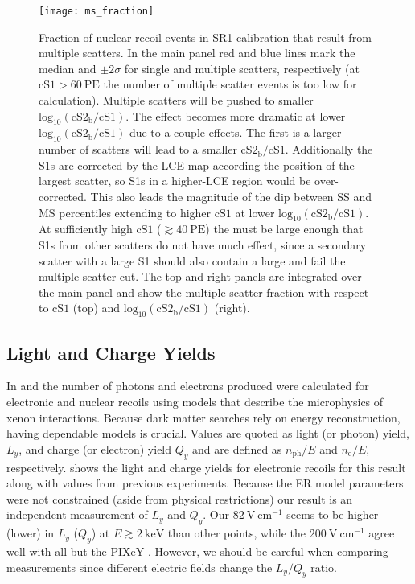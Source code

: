 \begin{figure}
\centering
\texttt{[image: ms\_fraction]}
\caption{Fraction of nuclear recoil events in SR1 \ambe calibration that result from multiple scatters.  In the main panel red and
blue lines mark the median and $\pm 2\sigma$ for single and multiple scatters, respectively (at $\mathrm{cS1} > 60\ \mathrm{PE}$ the
number of multiple scatter events is too low for calculation).  Multiple scatters will be pushed to smaller
$\mathrm{log}_{10}(\mathrm{cS2_b / cS1})$.  The effect becomes more dramatic at lower
$\mathrm{log}_{10}(\mathrm{cS2_b / cS1})$ due to a couple effects.  The first is a larger number of scatters will lead to a
smaller $\mathrm{cS2_b / cS1}$.  Additionally the S1s are corrected by the LCE map
according the position of the largest scatter, so S1s in a higher-LCE region
would be over-corrected.  This also leads the magnitude of the dip between SS and MS percentiles extending to higher $\mathrm{cS1}$
at lower $\mathrm{log}_{10}(\mathrm{cS2_b / cS1})$.  At sufficiently high $\mathrm{cS1}$ ($\gtrsim 40\ \mathrm{PE}$) the
\cstwob must be large enough that S1s from other scatters do not have much effect, since a secondary scatter with a large S1 should also
contain a large \stwob and fail the multiple scatter cut.  The top and right panels are integrated over the main panel and show the
multiple scatter fraction with respect to $\mathrm{cS1}$ (top) and $\mathrm{log}_{10}(\mathrm{cS2_b / cS1})$ (right).}
\label{fig:er_nr_calibrations_results_ms_fraction}
\end{figure}



\subsection{Light and Charge Yields}
\label{subsec:er_nr_calibrations_results_ly_qy}
In  and  the number
of photons and electrons produced were calculated for electronic and nuclear recoils using models that describe
the microphysics of xenon interactions.  Because dark matter searches rely on energy reconstruction, having dependable models is
crucial.  Values are quoted as light (or photon) yield, $L_y$, and charge (or electron) yield $Q_y$ and are defined as
$n_{\mathrm{ph}}/E$ and $n_{\mathrm{e}} / E$, respectively.   shows the light and
charge yields for electronic recoils for this result along with values from previous experiments.  Because the ER model parameters were
not constrained (aside from physical restrictions) our result is an independent measurement of $L_y$ and $Q_y$.  Our
$82\ \mathrm{V\ cm^{-1}}$ seems to be higher (lower) in $L_y$ ($Q_y$) at $E \gtrsim 2\ \mathrm{keV}$ than
other points, while the $200\ \mathrm{V\ cm^{-1}}$ agree well with all but the PIXeY .  However, we should be careful when
comparing measurements since different electric fields change the $L_y/Q_y$ ratio.

